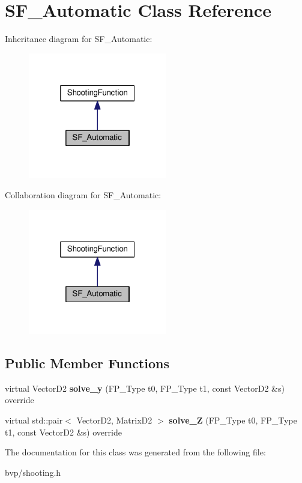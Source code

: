 \hypertarget{classSF__Automatic}{}\section{S\+F\+\_\+\+Automatic Class Reference}
\label{classSF__Automatic}


Inheritance diagram for S\+F\+\_\+\+Automatic\+:\nopagebreak
\begin{figure}[H]
\begin{center}
\leavevmode
\includegraphics[width=172pt]{classSF__Automatic__inherit__graph}
\end{center}
\end{figure}


Collaboration diagram for S\+F\+\_\+\+Automatic\+:\nopagebreak
\begin{figure}[H]
\begin{center}
\leavevmode
\includegraphics[width=172pt]{classSF__Automatic__coll__graph}
\end{center}
\end{figure}
\subsection*{Public Member Functions}
\begin{DoxyCompactItemize}
\item 
\mbox{\label{classSF__Automatic_af74ae5a8f2b900dffc4caf9901e6adbb}} 
virtual Vector\+D2 {\bfseries solve\+\_\+y} (F\+P\+\_\+\+Type t0, F\+P\+\_\+\+Type t1, const Vector\+D2 \&s) override
\item 
\mbox{\label{classSF__Automatic_a41c5df6b10d7a5f427e6204799a69703}} 
virtual std\+::pair$<$ Vector\+D2, Matrix\+D2 $>$ {\bfseries solve\+\_\+Z} (F\+P\+\_\+\+Type t0, F\+P\+\_\+\+Type t1, const Vector\+D2 \&s) override
\end{DoxyCompactItemize}


The documentation for this class was generated from the following file\+:\begin{DoxyCompactItemize}
\item 
bvp/shooting.\+h\end{DoxyCompactItemize}
